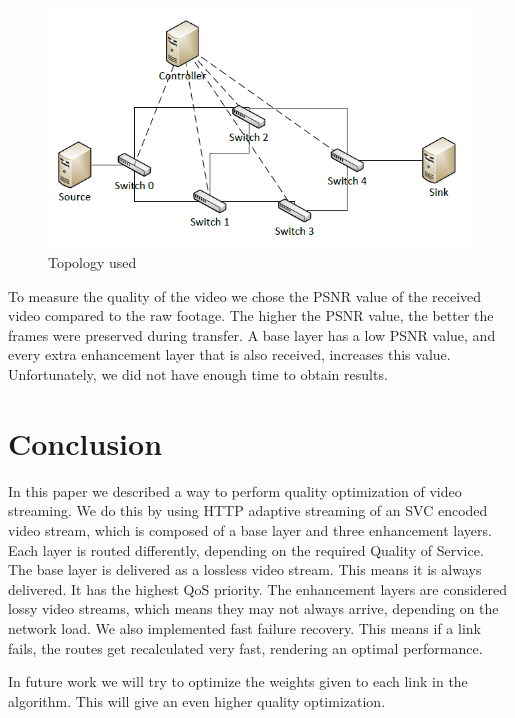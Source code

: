 \documentclass[conference]{IEEEtran}
\begin{document}
\begin{figure}[htb]
\centering
\includegraphics[scale=0.4]{fig/topology}
\caption{Topology used}
\label{fig:topology}
\end{figure}

To measure the quality of the video we chose the PSNR value of the received video compared to the raw footage. 
The higher the PSNR value, the better the frames were preserved during transfer. 
A base layer has a low PSNR value, and every extra enhancement layer that is also received, 
increases this value. %
Unfortunately, we did not have enough time to obtain results. 

\section{Conclusion}
In this paper we described a way to perform quality optimization of video streaming.
We do this by using HTTP adaptive streaming of an SVC encoded video stream, which is composed of a base layer and three enhancement layers.
Each layer is routed differently, depending on the required Quality of Service. 
The base layer is delivered as a lossless video stream. This means it is always delivered. It has the highest QoS priority.
The enhancement layers are considered lossy video streams, which means they may not always arrive, 
depending on the network load. We also implemented fast failure recovery. This means if a link fails, the routes get recalculated very fast, 
rendering an optimal performance.

In future work we will try to optimize the weights given to each link in the algorithm. 
This will give an even higher quality optimization.


\end{document}
